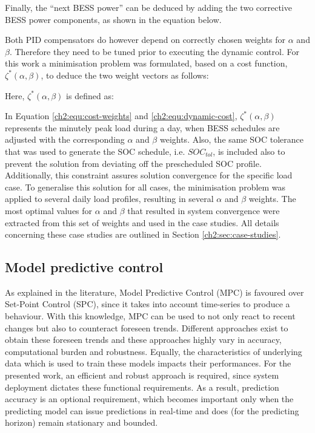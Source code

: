 Finally, the ``next BESS power'' can be deduced by adding the two corrective BESS power components, as shown in the equation below.



Both PID compensators do however depend on correctly chosen weights for $\alpha$ and $\beta$.
Therefore they need to be tuned prior to executing the dynamic control.
For this work a minimisation problem was formulated, based on a cost function, $\zeta^*(\alpha, \beta)$, to deduce the two weight vectors as follows:



Here, $\zeta^*(\alpha, \beta)$ is defined as:



In Equation \ref{ch2:equ:cost-weights} and \ref{ch2:equ:dynamic-cost}, $\zeta^*(\alpha, \beta)$ represents the minutely peak load during a day, when BESS schedules are adjusted with the corresponding $\alpha$ and $\beta$ weights.
Also, the same SOC tolerance that was used to generate the SOC schedule, i.e. $SOC_{tol}$, is included also to prevent the solution from deviating off the prescheduled SOC profile.
Additionally, this constraint assures solution convergence for the specific load case.
To generalise this solution for all cases, the minimisation problem was applied to several daily load profiles, resulting in several $\alpha$ and $\beta$ weights.
The most optimal values for $\alpha$ and $\beta$ that resulted in system convergence were extracted from this set of weights and used in the case studies.
All details concerning these case studies are outlined in Section \ref{ch2:sec:case-studies}.

\subsection{Model predictive control}

As explained in the literature, Model Predictive Control (MPC) is favoured over Set-Point Control (SPC), since it takes into account time-series to produce a behaviour.
With this knowledge, MPC can be used to not only react to recent changes but also to counteract foreseen trends.
Different approaches exist to obtain these foreseen trends and these approaches highly vary in accuracy, computational burden and robustness.
Equally, the characteristics of underlying data which is used to train these models impacts their performances.
For the presented work, an efficient and robust approach is required, since system deployment dictates these functional requirements.
As a result, prediction accuracy is an optional requirement, which becomes important only when the predicting model can issue predictions in real-time and does (for the predicting horizon) remain stationary and bounded.

